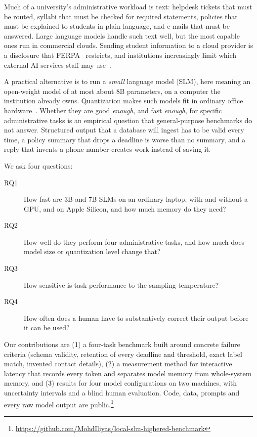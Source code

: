 \documentclass[sigconf,nonacm]{acmart}
\begin{document}
Much of a university's administrative workload is text: helpdesk tickets that must be routed, syllabi that must be checked for required statements, policies that must be explained to students in plain language, and e-mails that must be answered.
Large language models handle such text well, but the most capable ones run in commercial clouds.
Sending student information to a cloud provider is a disclosure that FERPA~\cite{ferpa} restricts, and institutions increasingly limit which external AI services staff may use~\cite{dong2025minimizing}.

A practical alternative is to run a \emph{small} language model (SLM), here meaning an open-weight model of at most about 8B parameters, on a computer the institution already owns.
Quantization makes such models fit in ordinary office hardware~\cite{husom2025sustainable,kurt2026quantization}.
Whether they are good \emph{enough}, and fast \emph{enough}, for specific administrative tasks is an empirical question that general-purpose benchmarks do not answer.
Structured output that a database will ingest has to be valid every time, a policy summary that drops a deadline is worse than no summary, and a reply that invents a phone number creates work instead of saving it.

We ask four questions:
\begin{description}
  \item[RQ1] How fast are 3B and 7B SLMs on an ordinary laptop, with and without a GPU, and on Apple Silicon, and how much memory do they need?
  \item[RQ2] How well do they perform four administrative tasks, and how much does model size or quantization level change that?
  \item[RQ3] How sensitive is task performance to the sampling temperature?
  \item[RQ4] How often does a human have to substantively correct their output before it can be used?
\end{description}

Our contributions are (1) a four-task benchmark built around concrete failure criteria (schema validity, retention of every deadline and threshold, exact label match, invented contact details), (2) a measurement method for interactive latency that records every token and separates model memory from whole-system memory, and (3) results for four model configurations on two machines, with uncertainty intervals and a blind human evaluation.
Code, data, prompts and every raw model output are public.\footnote{\url{https://github.com/MohdIliyas/local-slm-highered-benchmark}}
\end{document}
